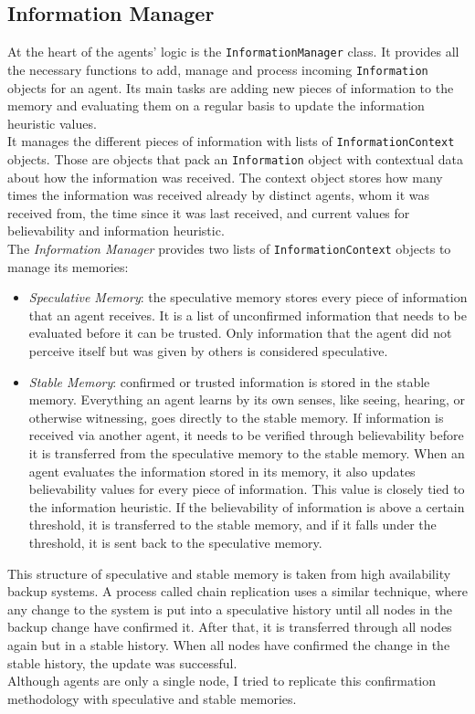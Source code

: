 \subsection{Information Manager}
At the heart of the agents' logic is the \verb|InformationManager| class. It provides all the necessary functions to add, manage and process incoming \verb|Information| objects for an agent. Its main tasks are adding new pieces of information to the memory and evaluating them on a regular basis to update the information heuristic values.\\
It manages the different pieces of information with lists of \verb|InformationContext| objects. Those are objects that pack an \verb|Information| object with contextual data about how the information was received. The context object stores how many times the information was received already by distinct agents, whom it was received from, the time since it was last received, and current values for believability and information heuristic.\\
The \textit{Information Manager} provides two lists of \verb|InformationContext| objects to manage its memories:
\begin{itemize}
	\item \textit{Speculative Memory}: the speculative memory stores every piece of information that an agent receives. It is a list of unconfirmed information that needs to be evaluated before it can be trusted. Only information that the agent did not perceive itself but was given by others is considered speculative.
	\item \textit{Stable Memory}: confirmed or trusted information is stored in the stable memory. Everything an agent learns by its own senses, like seeing, hearing, or otherwise witnessing, goes directly to the stable memory. If information is received via another agent, it needs to be verified through believability before it is transferred from the speculative memory to the stable memory. When an agent evaluates the information stored in its memory, it also updates believability values for every piece of information. This value is closely tied to the information heuristic. If the believability of information is above a certain threshold, it is transferred to the stable memory, and if it falls under the threshold, it is sent back to the speculative memory.
\end{itemize}
This structure of speculative and stable memory is taken from high availability backup systems. A process called chain replication uses a similar technique, where any change to the system is put into a speculative history until all nodes in the backup change have confirmed it. After that, it is transferred through all nodes again but in a stable history. When all nodes have confirmed the change in the stable history, the update was successful.~\cite{Van2004}\\
Although agents are only a single node, I tried to replicate this confirmation methodology with speculative and stable memories.
